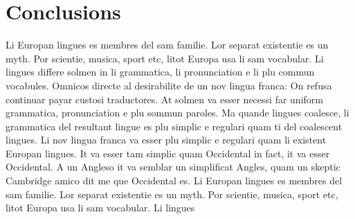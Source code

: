 \chapter{Conclusions}

Li Europan lingues es membres del sam familie. Lor separat existentie es un myth. Por scientie, musica, sport etc, litot Europa usa li sam vocabular. Li lingues differe solmen in li grammatica, li pronunciation e li plu commun vocabules. Omnicos directe al desirabilite de un nov lingua franca: On refusa continuar payar custosi traductores. At solmen va esser necessi far uniform grammatica, pronunciation e plu sommun paroles. Ma quande lingues coalesce, li grammatica del resultant lingue es plu simplic e regulari quam ti del coalescent lingues. Li nov lingua franca va esser plu simplic e regulari quam li existent Europan lingues. It va esser tam simplic quam Occidental in fact, it va esser Occidental. A un Angleso it va semblar un simplificat Angles, quam un skeptic Cambridge amico dit me que Occidental es. Li Europan lingues es membres del sam familie. Lor separat existentie es un myth. Por scientie, musica, sport etc, litot Europa usa li sam vocabular. Li lingues 